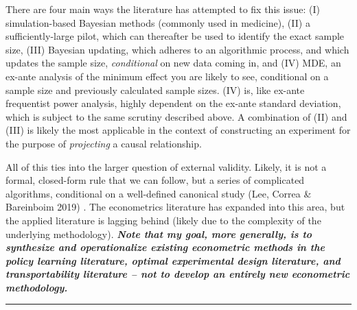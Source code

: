 \documentclass[12pt,letterpaper,doublespace, oneside]{article}
\begin{document}
There are four main ways the literature has attempted to fix this issue: (I) simulation-based Bayesian methods (commonly used in medicine), (II) a sufficiently-large pilot, which can thereafter be used to identify the exact sample size, (III) Bayesian updating, which adheres to an algorithmic process, and which updates the sample size, \emph{conditional} on new data coming in, and (IV) MDE, an ex-ante analysis of the minimum effect you are likely to see, conditional on a sample size and previously calculated sample sizes. (IV) is, like ex-ante frequentist power analysis, highly dependent on the ex-ante standard deviation, which is subject to the same scrutiny described above. A combination of (II) and (III) is likely the most applicable in the context of constructing an experiment for the purpose of \emph{projecting} a causal relationship. 

All of this ties into the larger question of external validity. Likely, it is not a formal, closed-form rule that we can follow, but a series of complicated algorithms, conditional on a well-defined canonical study (Lee, Correa \& Bareinboim 2019) \cite{Lee2019}. The econometrics literature has expanded into this area, but the applied literature is lagging behind (likely due to the complexity of the underlying methodology). \textbf{\emph{Note that my goal, more generally, is to synthesize and operationalize existing econometric methods in the policy learning literature, optimal experimental design literature, and transportability literature -- not to develop an entirely new econometric methodology.}}



\noindent\rule{\linewidth}{0.4pt}
\end{document}
